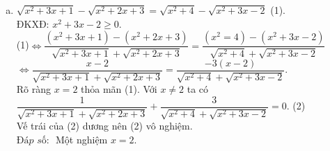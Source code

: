 \begin{bt}
{\begin{enumerate}[a)]
        $\Leftrightarrow (x-1)\left(\sqrt{2x+1}\cdot\sqrt{x+2}+4-2\sqrt{2x+1}-2\sqrt{x+2}\right)=0$.\\
        Hiển nhiên $x=1$ thỏa mãn (1). Với $x\ne 1$ ta có\\
        $\sqrt{2x+1}\left(\sqrt{x+2}-2\right)-2\left(\sqrt{x+2}-2\right)=0$\\
        $\Leftrightarrow \left(\sqrt{x+2}-2\right)\left(\sqrt{2x+1}-2\right)=0\Leftrightarrow \hoac{&x=2\\&x=\dfrac{3}{2}}$.\\
        $\textit{Đáp số: }$ Ba nghiệm $x=1,\ x=\dfrac{3}{2},\ x=2$.
        \item $\sqrt{x^2+3x+1}-\sqrt{x^2+2x+3}=\sqrt{x^2+4}-\sqrt{x^2+3x-2}$\hspace{2cm} (1).\\
        ĐKXĐ: $x^2+3x-2\ge 0$.\\
        (1)$\Leftrightarrow \dfrac{(x^2+3x+1)-(x^2+2x+3)}{\sqrt{x^2+3x+1}+\sqrt{x^2+2x+3}}=\dfrac{(x^2=4)-(x^2+3x-2)}{\sqrt{x^2+4}+\sqrt{x^2+3x-2}}$\\
        $\Leftrightarrow \dfrac{x-2}{\sqrt{x^2+3x+1}+\sqrt{x^2+2x+3}}=\dfrac{-3(x-2)}{\sqrt{x^2+4}+\sqrt{x^2+3x-2}}$.\\
        Rõ ràng $x=2$ thỏa mãn (1). Với $x\ne 2$ ta có\\
        $\dfrac{1}{\sqrt{x^2+3x+1}+\sqrt{x^2+2x+3}}+\dfrac{3}{\sqrt{x^2+4}+\sqrt{x^2+3x-2}}=0$.\hspace{1cm} (2)\\
        Vế trái của (2) dương nên (2) vô nghiệm.\\
        $\textit{Đáp số: }$ Một nghiệm $x=2$.
\end{enumerate}           
    }
\end{bt}
